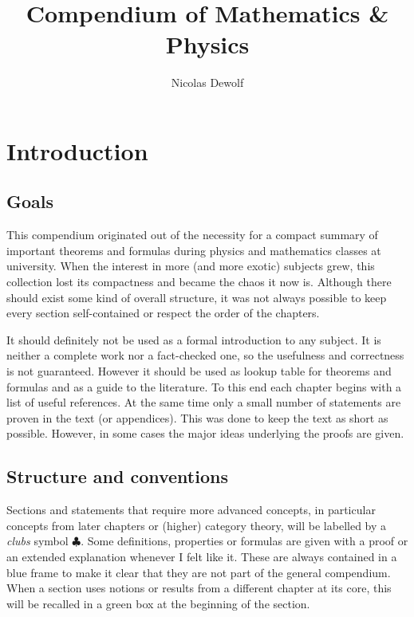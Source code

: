 \documentclass[11pt, a4paper]{report}
\begin{document}
\title{Compendium of Mathematics \& Physics}
\author{Nicolas Dewolf}
\maketitle

\tableofcontents

\chapter{Introduction}
\section{Goals}

   This compendium originated out of the necessity for a compact summary of important theorems and formulas during physics and mathematics classes at university. When the interest in more (and more exotic) subjects grew, this collection lost its compactness and became the chaos it now is. Although there should exist some kind of overall structure, it was not always possible to keep every section self-contained or respect the order of the chapters.

   It should definitely not be used as a formal introduction to any subject. It is neither a complete work nor a fact-checked one, so the usefulness and correctness is not guaranteed. However it should be used as lookup table for theorems and formulas and as a guide to the literature. To this end each chapter begins with a list of useful references. At the same time only a small number of statements are proven in the text (or appendices). This was done to keep the text as short as possible. However, in some cases the major ideas underlying the proofs are given.

\section{Structure and conventions}

   Sections and statements that require more advanced concepts, in particular concepts from later chapters or (higher) category theory, will be labelled by a \textit{clubs} symbol $\clubsuit$. Some definitions, properties or formulas are given with a proof or an extended explanation whenever I felt like it. These are always contained in a blue frame to make it clear that they are not part of the general compendium. When a section uses notions or results from a different chapter at its core, this will be recalled in a green box at the beginning of the section.
\end{document}
